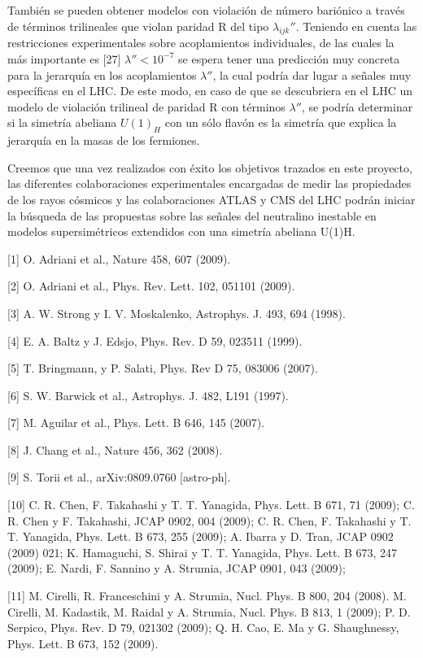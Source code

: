 \begin{ideas}
También se pueden obtener modelos con violación de número bariónico a través de 
términos trilineales que violan paridad R del tipo $\lambda_{ijk}''$. Teniendo en cuenta las 
restricciones experimentales sobre acoplamientos individuales, de las cuales la más 
importante es [27] $\lambda''< 10^{-7}$ se espera tener una predicción muy concreta para la 
jerarquía en los acoplamientos $\lambda''$, la cual podría dar lugar a señales muy específicas 
en el LHC. De este modo, en caso de que se descubriera en el LHC un modelo de violación 
trilineal de paridad R con términos $\lambda''$, se podría determinar si la simetría abeliana 
$U(1)_H$ con un sólo flavón es la simetría que explica la jerarquía en la masas de los fermiones.


Creemos que una vez realizados con éxito los objetivos trazados en este proyecto, 
las diferentes colaboraciones experimentales encargadas de medir las propiedades 
de los rayos cósmicos y las colaboraciones ATLAS y CMS del LHC podrán iniciar 
la búsqueda de las propuestas sobre las señales del neutralino inestable en modelos 
supersimétricos extendidos con una simetría abeliana U(1)H. 

[1] O. Adriani et al., Nature 458, 607 (2009).

[2] O. Adriani et al., Phys. Rev. Lett. 102, 051101 (2009).

[3] A. W. Strong y I. V. Moskalenko, Astrophys. J. 493, 694 (1998).

[4] E. A. Baltz y J. Edsjo, Phys. Rev. D 59, 023511 (1999).

[5] T. Bringmann, y P. Salati, Phys. Rev D 75, 083006 (2007).

[6] S. W. Barwick et al., Astrophys. J. 482, L191 (1997).

[7] M. Aguilar et al., Phys. Lett. B 646, 145 (2007).

[8] J. Chang et al., Nature 456, 362 (2008).

[9] S. Torii et al., arXiv:0809.0760 [astro-ph].

[10] C. R. Chen, F. Takahashi y T. T. Yanagida, Phys. Lett. B 671, 71 (2009); C. R. Chen y F. Takahashi, JCAP 0902, 004 (2009); 
C. R. Chen, F. Takahashi y T. T. Yanagida, Phys. Lett. B 673, 255 (2009); A. Ibarra y D. Tran, JCAP 0902 (2009) 021; 
K. Hamaguchi, S. Shirai y T. T. Yanagida, Phys. Lett. B 673, 247 (2009); E. Nardi, F. Sannino y A. Strumia, JCAP 0901, 043 (2009);

[11] M. Cirelli, R. Franceschini y A. Strumia, Nucl. Phys. B 800, 204 (2008). M. Cirelli, M. Kadastik, M. Raidal y A. Strumia, 
Nucl. Phys. B 813, 1 (2009); P. D. Serpico, Phys. Rev. D 79, 021302 (2009); Q. H. Cao, E. Ma y G. Shaughnessy, 
Phys. Lett. B 673, 152 (2009).


\end{ideas}
